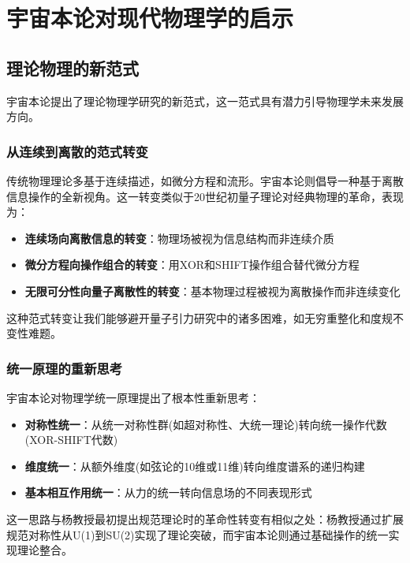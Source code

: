 \chapter{宇宙本论对现代物理学的启示}

\section{理论物理的新范式}

宇宙本论提出了理论物理学研究的新范式，这一范式具有潜力引导物理学未来发展方向。

\subsection{从连续到离散的范式转变}

传统物理理论多基于连续描述，如微分方程和流形。宇宙本论则倡导一种基于离散信息操作的全新视角。这一转变类似于20世纪初量子理论对经典物理的革命，表现为：

\begin{itemize}
  \item \textbf{连续场向离散信息的转变}：物理场被视为信息结构而非连续介质
  \item \textbf{微分方程向操作组合的转变}：用XOR和SHIFT操作组合替代微分方程
  \item \textbf{无限可分性向量子离散性的转变}：基本物理过程被视为离散操作而非连续变化
\end{itemize}

这种范式转变让我们能够避开量子引力研究中的诸多困难，如无穷重整化和度规不变性难题。

\subsection{统一原理的重新思考}

宇宙本论对物理学统一原理提出了根本性重新思考：

\begin{itemize}
  \item \textbf{对称性统一}：从统一对称性群(如超对称性、大统一理论)转向统一操作代数(XOR-SHIFT代数)
  \item \textbf{维度统一}：从额外维度(如弦论的10维或11维)转向维度谱系的递归构建
  \item \textbf{基本相互作用统一}：从力的统一转向信息场的不同表现形式
\end{itemize}

这一思路与杨教授最初提出规范理论时的革命性转变有相似之处：杨教授通过扩展规范对称性从U(1)到SU(2)实现了理论突破，而宇宙本论则通过基础操作的统一实现理论整合。

